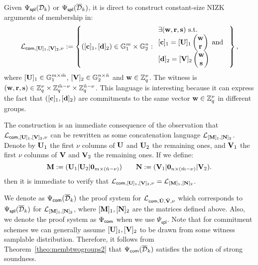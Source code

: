 Given ${\Psi_{\mathsf{spl}}(\mathcal{D}_k)}$ or ${\Psi_\mathsf{spl}(\overline{\mathcal{D}}_k)}$, it is direct to construct constant-size NIZK arguments of membership in:
$$\mathcal{L}_{\mathsf{com},[\mathbf{{U}}]_1,[\mathbf{{V}}]_2,\nu}:=\left\{([\mathbf{c}]_1,[\mathbf{d}]_2) \in \mathbb{G}_1^{m} \times \mathbb{G}_2^{n}:
\begin{array}{l}
    \exists (\mathbf{w},\mathbf{r},\mathbf{s}) \text{ s.t. }\\
    {[\mathbf{c}]_1= [\mathbf{{U}}]_1 \begin{pmatrix} \mathbf{w}\\ \mathbf{r} \end{pmatrix} \text{ and }}\\
    {[\mathbf{d}]_2=[\mathbf{{V}}]_2 \begin{pmatrix} \mathbf{w} \\ \mathbf{s} \end{pmatrix}}
\end{array}
\right\},$$
where $[\mathbf{{U}}]_1\in \mathbb{G}_1^{m \times \tilde{m}}$, 
$[\mathbf{{V}}]_2 \in \mathbb{G}_2^{n \times \tilde{n}}$
and $\mathbf{w} \in \mathbb{Z}_q^{\nu}$. The witness is 
 $(\mathbf{w},\mathbf{r},\mathbf{s}) \in \mathbb{Z}_q^{\nu} \times \mathbb{Z}_q^{\tilde{m}-\nu} \times \mathbb{Z}_q^{\tilde{n}-\nu}$. This language is interesting because it can express the fact that 
$([\mathbf{c}]_1,[\mathbf{d}]_2)$ are commitments to the same vector 
$\mathbf{w} \in \mathbb{Z}_q^{\nu}$ in different groups.
 
The construction is an immediate consequence of the observation 
that $\mathcal{L}_{\mathsf{com},[\mathbf{{U}}]_1,[\mathbf{{V}}]_2,\nu}$  can be rewritten as some concatenation language $\mathcal{L}_{[\mathbf{{M}}]_1,[\mathbf{{N}}]_2}$.
Denote by $\mathbf{{U}}_1$ the first $\nu$ columns of $\mathbf{{U}}$  and $\mathbf{{U}}_2$ the remaining ones, and $\mathbf{{V}}_1$ the first $\nu$ columns of $\mathbf{{V}}$ and $\mathbf{{V}}_2$ the remaining ones. If we define: 
\begin{equation*}
 \mathbf{{M}} := (\mathbf{{U}}_1|\mathbf{{U}}_2|\mathbf{{0}}_{m\times (\tilde{n}-\nu)}) \qquad
\mathbf{{N}} := (\mathbf{{V}}_1|\mathbf{{0}}_{n\times (\tilde{m}- \nu)}|\mathbf{{V}}_2).
\end{equation*}
then it is immediate to verify that $\mathcal{L}_{\mathsf{com},[\mathbf{{U}}]_1,[\mathbf{{V}}]_2,\nu}=\mathcal{L}_{[\mathbf{{M}}]_1,[\mathbf{{N}}]_2}$.

We denote as ${\Psi_{\mathsf{com}}(\overline{\mathcal{D}}_k)}$ the proof 
system for $\mathcal{L}_{\mathsf{com},{\hat{\mathbf{{U}}}},\check{\mathbf{{V}}},\nu}$ which corresponds to ${\Psi_\mathsf{spl}(\overline{\mathcal{D}}_k)}$ for $\mathcal{L}_{[\mathbf{{M}}]_1,[\mathbf{{N}}]_2}$, where $[\mathbf{{M}}]_1,[\mathbf{{N}}]_2$ are the matrices defined above. Also, we denote the proof system as $\Psi_{\mathsf{com}}$ when we use $\Psi_\mathsf{spl}$. Note that for commitment schemes we can generally assume $[\mathbf{{U}}]_1,[\mathbf{{V}}]_2$ to be drawn from some witness samplable distribution. Therefore, it follows from Theorem~\ref{theo:membtwogroups2} that ${\Psi_{\mathsf{com}}(\overline{\mathcal{D}}_k)}$ satisfies the notion of strong soundness.  
